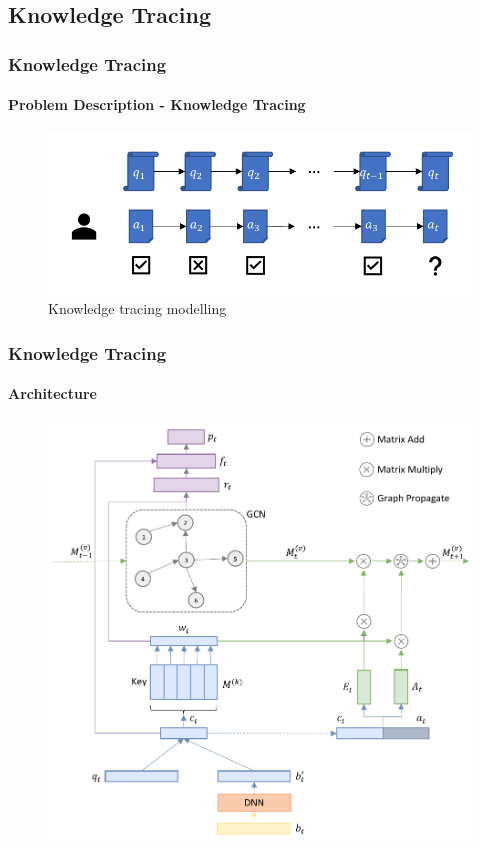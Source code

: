 \documentclass{beamer}
\begin{document}
\subsection{Knowledge Tracing}

\begin{frame}
  \frametitle{Knowledge Tracing}
  \framesubtitle{Problem Description - Knowledge Tracing}
  \begin{figure}
    \centering
    \includegraphics[width=1.0\textwidth]{figures/ch3-model-ktdes.pdf}
    \caption{Knowledge tracing modelling}
  \end{figure}
\end{frame}


\begin{frame}
  \frametitle{Knowledge Tracing}
  \framesubtitle{Architecture}
  \begin{figure}
    \centering
    \includegraphics[height=0.80\textheight]{figures/ch3-ov.pdf}
  \end{figure}
\end{frame}
\end{document}

